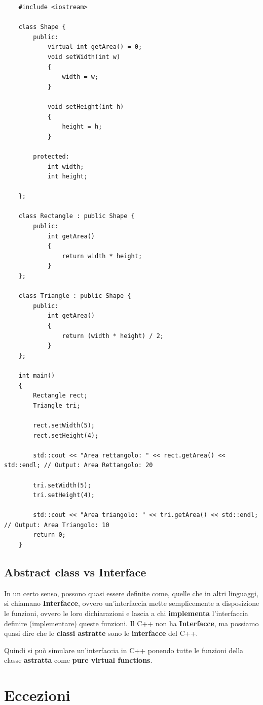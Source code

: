 \begin{lstlisting}
	#include <iostream>
	
	class Shape {
		public:
			virtual int getArea() = 0;
			void setWidth(int w)
			{
				width = w;
			}
		
			void setHeight(int h)
			{
				height = h;
			}
		
		protected:
			int width;
			int height;
			
	};

	class Rectangle : public Shape {
		public:
			int getArea()
			{
				return width * height;
			}
	};

	class Triangle : public Shape {
		public:
			int getArea()
			{
				return (width * height) / 2;
			}
	};

	int main()
	{
		Rectangle rect;
		Triangle tri;
		
		rect.setWidth(5);
		rect.setHeight(4);
		
		std::cout << "Area rettangolo: " << rect.getArea() << std::endl; // Output: Area Rettangolo: 20
		
		tri.setWidth(5);
		tri.setHeight(4);
		
		std::cout << "Area triangolo: " << tri.getArea() << std::endl; // Output: Area Triangolo: 10
		return 0;
	}
\end{lstlisting}

\subsection{Abstract class vs Interface}

\textsf{\small In un certo senso, possono quasi essere definite come, quelle che in altri linguaggi, si chiamano \textbf{Interfacce}, ovvero un'interfaccia mette semplicemente a disposizione le funzioni, ovvero le loro dichiarazioni e lascia a chi \textbf{implementa} l'interfaccia definire (implementare) queste funzioni. Il C++ non ha \textbf{Interfacce}, ma possiamo quasi dire che le \textbf{classi astratte} sono le \textbf{interfacce} del C++.} \break

\textsf{\small Quindi si può simulare un'interfaccia in C++ ponendo tutte le funzioni della classe \textbf{astratta} come \textbf{pure virtual functions}.} \\


\newpage

\section{Eccezioni}

